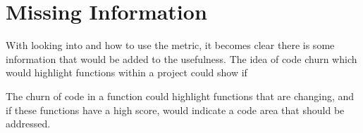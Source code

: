 \section{Missing Information}
With looking into \cc and how to use the metric, it becomes clear there is some information that would be added to the usefulness.
The idea of code churn which would highlight functions within a project could show if

The churn of code in a function could highlight functions that are changing, and if these functions have a high \cc score, would indicate a code area that should be addressed.